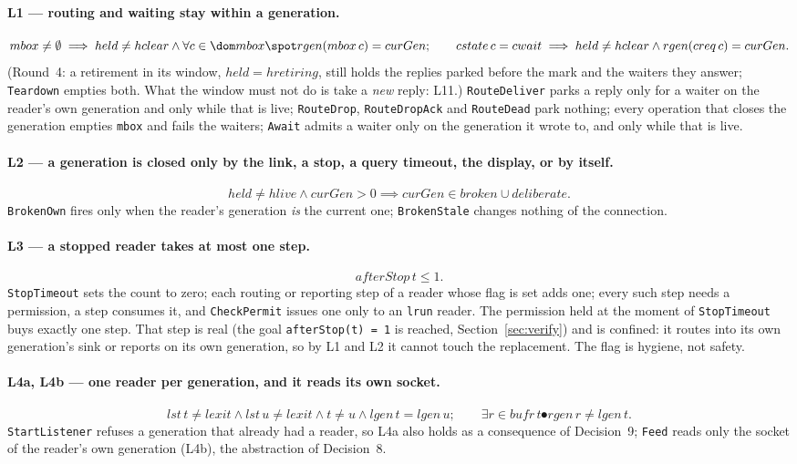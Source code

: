 \documentclass[a4paper,10pt,fleqn]{article}
\begin{document}
\paragraph{L1 --- routing and waiting stay within a generation.}
\[ mbox \ne \emptyset \implies held \ne hclear \land
   \forall c \in \dom mbox \spot rgen(mbox\,c) = curGen;\qquad
   cstate\,c = cwait \implies held \ne hclear \land rgen(creq\,c) = curGen. \]
(Round~4: a retirement in its window, $held = hretiring$, still holds the replies
parked before the mark and the waiters they answer; \texttt{Teardown} empties
both.  What the window must not do is take a \emph{new} reply: L11.)
\texttt{RouteDeliver} parks a reply only for a waiter on the reader's own
generation and only while that is live; \texttt{RouteDrop},
\texttt{RouteDropAck} and \texttt{RouteDead} park nothing; every operation that
closes the generation empties \texttt{mbox} and fails the waiters;
\texttt{Await} admits a waiter only on the generation it wrote to, and only
while that is live.

\paragraph{L2 --- a generation is closed only by the link, a stop, a query
timeout, the display, or by itself.}
\[ held \ne hlive \land curGen > 0 \implies curGen \in broken \cup deliberate. \]
\texttt{BrokenOwn} fires only when the reader's generation \emph{is} the
current one; \texttt{BrokenStale} changes nothing of the connection.

\paragraph{L3 --- a stopped reader takes at most one step.}
\[ afterStop\,t \le 1. \]
\texttt{StopTimeout} sets the count to zero; each routing or reporting step of
a reader whose flag is set adds one; every such step needs a permission, a
step consumes it, and \texttt{CheckPermit} issues one only to an \texttt{lrun}
reader.  The permission held at the moment of \texttt{StopTimeout} buys exactly
one step.  That step is real (the goal \texttt{afterStop(t) = 1} is reached,
Section~\ref{sec:verify}) and is confined: it routes into its own
generation's sink or reports on its own generation, so by L1 and L2 it cannot
touch the replacement.  The flag is hygiene, not safety.

\paragraph{L4a, L4b --- one reader per generation, and it reads its own socket.}
\[ lst\,t \ne lexit \land lst\,u \ne lexit \land t \ne u \land lgen\,t = lgen\,u;
   \qquad \exists r \in bufr\,t \spot rgen\,r \ne lgen\,t. \]
\texttt{StartListener} refuses a generation that already had a reader, so
L4a also holds as a consequence of Decision~9; \texttt{Feed} reads only the
socket of the reader's own generation (L4b), the abstraction of Decision~8.
\end{document}
